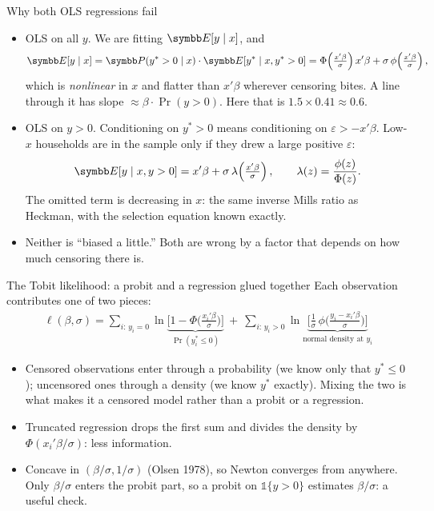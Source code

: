 \documentclass[aspectratio=169,11pt]{beamer}
\begin{document}
\begin{frame}{Why both OLS regressions fail}
\begin{itemize}
	\item \alert{OLS on all $y$.} We are fitting $\E[y \mid x]$, and
	\begin{align*}
		\E[y \mid x] = \Pr(y^* > 0 \mid x)\cdot \E[y^* \mid x, y^* > 0] = \Phi\!\left(\tfrac{x'\beta}{\sigma}\right) x'\beta + \sigma\,\phi\!\left(\tfrac{x'\beta}{\sigma}\right),
	\end{align*}
	which is \emph{nonlinear} in $x$ and flatter than $x'\beta$ wherever censoring bites. A line through it
	has slope $\approx \beta \cdot \Pr(y > 0)$. Here that is $1.5 \times 0.41 \approx 0.6$.
	\medskip
	\item \alert{OLS on $y > 0$.} Conditioning on $y^* > 0$ means conditioning on $\varepsilon > -x'\beta$.
	Low-$x$ households are in the sample only if they drew a large positive $\varepsilon$:
	\begin{align*}
		\E[y \mid x, y > 0] = x'\beta + \sigma\,\lambda\!\left(\tfrac{x'\beta}{\sigma}\right), \qquad \lambda(z) = \frac{\phi(z)}{\Phi(z)} .
	\end{align*}
	The omitted term is decreasing in $x$: the same inverse Mills ratio as Heckman, with the selection
	equation known exactly.
	\medskip
	\item Neither is ``biased a little.'' Both are wrong by a factor that depends on how much censoring there is.
\end{itemize}
\end{frame}


\begin{frame}{The Tobit likelihood: a probit and a regression glued together}
Each observation contributes one of two pieces:
\begin{align*}
	\ell(\beta, \sigma) = \sum_{i:\, y_i = 0} \ln \underbrace{\Big[1 - \Phi\!\Big(\tfrac{x_i'\beta}{\sigma}\Big)\Big]}_{\Pr(y^*_i \le 0)}
	\ +\ \sum_{i:\, y_i > 0} \ln \underbrace{\Big[\tfrac{1}{\sigma}\,\phi\!\Big(\tfrac{y_i - x_i'\beta}{\sigma}\Big)\Big]}_{\text{normal density at } y_i}
\end{align*}
\begin{itemize}
	\item Censored observations enter through a \alert{probability} (we know only that $y^* \le 0$);
	uncensored ones through a \alert{density} (we know $y^*$ exactly). Mixing the two is what makes it
	a censored model rather than a probit or a regression.
	\medskip
	\item Truncated regression drops the first sum and divides the density by $\Phi(x_i'\beta/\sigma)$:
	less information.
	\item Concave in $(\beta/\sigma, 1/\sigma)$ (Olsen 1978), so Newton converges from anywhere. Only
	$\beta/\sigma$ enters the probit part, so a probit on $\mathbb{1}\{y > 0\}$ estimates $\beta/\sigma$: a useful check.
\end{itemize}
\end{frame}
\end{document}
